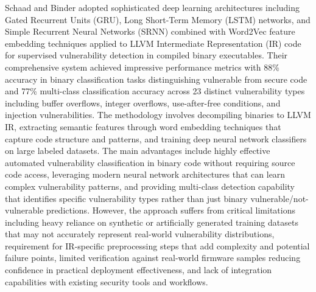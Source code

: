 Schaad and Binder \cite{schaad2022dlvuln} adopted sophisticated deep learning architectures including Gated Recurrent Units (GRU), Long Short-Term Memory (LSTM) networks, and Simple Recurrent Neural Networks (SRNN) combined with Word2Vec feature embedding techniques applied to LLVM Intermediate Representation (IR) code for supervised vulnerability detection in compiled binary executables. Their comprehensive system achieved impressive performance metrics with 88\% accuracy in binary classification tasks distinguishing vulnerable from secure code and 77\% multi-class classification accuracy across 23 distinct vulnerability types including buffer overflows, integer overflows, use-after-free conditions, and injection vulnerabilities. The methodology involves decompiling binaries to LLVM IR, extracting semantic features through word embedding techniques that capture code structure and patterns, and training deep neural network classifiers on large labeled datasets. The main advantages include highly effective automated vulnerability classification in binary code without requiring source code access, leveraging modern neural network architectures that can learn complex vulnerability patterns, and providing multi-class detection capability that identifies specific vulnerability types rather than just binary vulnerable/not-vulnerable predictions. However, the approach suffers from critical limitations including heavy reliance on synthetic or artificially generated training datasets that may not accurately represent real-world vulnerability distributions, requirement for IR-specific preprocessing steps that add complexity and potential failure points, limited verification against real-world firmware samples reducing confidence in practical deployment effectiveness, and lack of integration capabilities with existing security tools and workflows.

